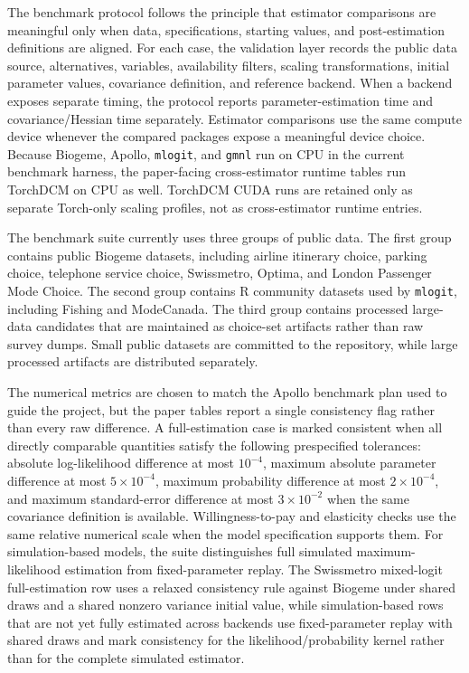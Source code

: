 The benchmark protocol follows the principle that estimator comparisons are meaningful only when data, specifications, starting values, and post-estimation definitions are aligned.
For each case, the validation layer records the public data source, alternatives, variables, availability filters, scaling transformations, initial parameter values, covariance definition, and reference backend.
When a backend exposes separate timing, the protocol reports parameter-estimation time and covariance/Hessian time separately.
Estimator comparisons use the same compute device whenever the compared packages expose a meaningful device choice.
Because Biogeme, Apollo, \texttt{mlogit}, and \texttt{gmnl} run on CPU in the current benchmark harness, the paper-facing cross-estimator runtime tables run TorchDCM on CPU as well.
TorchDCM CUDA runs are retained only as separate Torch-only scaling profiles, not as cross-estimator runtime entries.

The benchmark suite currently uses three groups of public data.
The first group contains public Biogeme datasets, including airline itinerary choice, parking choice, telephone service choice, Swissmetro, Optima, and London Passenger Mode Choice.
The second group contains R community datasets used by \texttt{mlogit}, including Fishing and ModeCanada.
The third group contains processed large-data candidates that are maintained as choice-set artifacts rather than raw survey dumps.
Small public datasets are committed to the repository, while large processed artifacts are distributed separately.

The numerical metrics are chosen to match the Apollo benchmark plan used to guide the project, but the paper tables report a single consistency flag rather than every raw difference.
A full-estimation case is marked consistent when all directly comparable quantities satisfy the following prespecified tolerances: absolute log-likelihood difference at most $10^{-4}$, maximum absolute parameter difference at most $5\times10^{-4}$, maximum probability difference at most $2\times10^{-4}$, and maximum standard-error difference at most $3\times10^{-2}$ when the same covariance definition is available.
Willingness-to-pay and elasticity checks use the same relative numerical scale when the model specification supports them.
For simulation-based models, the suite distinguishes full simulated maximum-likelihood estimation from fixed-parameter replay.
The Swissmetro mixed-logit full-estimation row uses a relaxed consistency rule against Biogeme under shared draws and a shared nonzero variance initial value, while simulation-based rows that are not yet fully estimated across backends use fixed-parameter replay with shared draws and mark consistency for the likelihood/probability kernel rather than for the complete simulated estimator.

